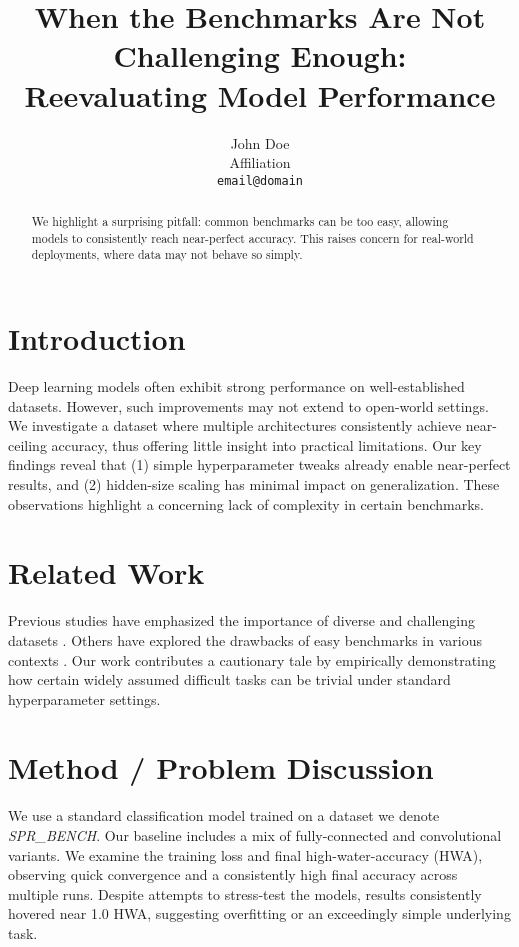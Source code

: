 \documentclass{article}
\begin{document}
\title{When the Benchmarks Are Not Challenging Enough: \\ Reevaluating Model Performance}
\author{John Doe \\
Affiliation \\
\texttt{email@domain}}
\date{}

\maketitle

\begin{abstract}
We highlight a surprising pitfall: common benchmarks can be too easy, allowing models to consistently reach near-perfect accuracy. This raises concern for real-world deployments, where data may not behave so simply.
\end{abstract}

\section{Introduction}
Deep learning models often exhibit strong performance on well-established datasets. However, such improvements may not extend to open-world settings. We investigate a dataset where multiple architectures consistently achieve near-ceiling accuracy, thus offering little insight into practical limitations. Our key findings reveal that (1) simple hyperparameter tweaks already enable near-perfect results, and (2) hidden-size scaling has minimal impact on generalization. These observations highlight a concerning lack of complexity in certain benchmarks.

\section{Related Work}
Previous studies have emphasized the importance of diverse and challenging datasets \citep{Schmidhuber2015, Kingma2014}. Others have explored the drawbacks of easy benchmarks in various contexts \citep{Jang2016}. Our work contributes a cautionary tale by empirically demonstrating how certain widely assumed difficult tasks can be trivial under standard hyperparameter settings.

\section{Method / Problem Discussion}
We use a standard classification model trained on a dataset we denote \textit{SPR\_BENCH}. Our baseline includes a mix of fully-connected and convolutional variants. We examine the training loss and final high-water-accuracy (HWA), observing quick convergence and a consistently high final accuracy across multiple runs. Despite attempts to stress-test the models, results consistently hovered near 1.0 HWA, suggesting overfitting or an exceedingly simple underlying task.
\end{document}
